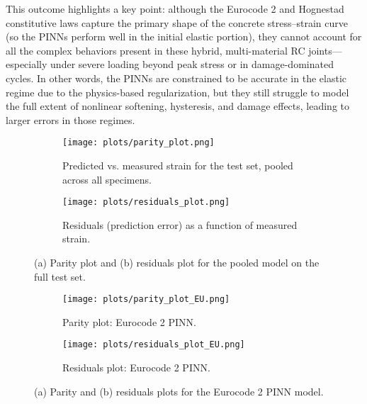 \documentclass{article}
\begin{document}
This outcome highlights a key point: although the Eurocode 2 and Hognestad constitutive laws capture the primary shape of the concrete stress–strain curve (so the PINNs perform well in the initial elastic portion), they cannot account for all the complex behaviors present in these hybrid, multi-material RC joints—especially under severe loading beyond peak stress or in damage-dominated cycles. In other words, the PINNs are constrained to be accurate in the elastic regime due to the physics-based regularization, but they still struggle to model the full extent of nonlinear softening, hysteresis, and damage effects, leading to larger errors in those regimes.


\begin{figure}[H]
    \centering
    \begin{subfigure}[b]{0.48\textwidth}
        \texttt{[image: plots/parity\_plot.png]}
        \caption{Predicted vs. measured strain for the test set, pooled across all specimens.}
        \label{fig:parity_pooled}
    \end{subfigure}
    \hfill
    \begin{subfigure}[b]{0.48\textwidth}
        \texttt{[image: plots/residuals\_plot.png]}
        \caption{Residuals (prediction error) as a function of measured strain.}
        \label{fig:residuals_pooled}
    \end{subfigure}
    \caption{(a) Parity plot and (b) residuals plot for the pooled model on the full test set.}
    \label{fig:pooled_parity_residual}
\end{figure}

\begin{figure}[H]
    \centering
    \begin{subfigure}[b]{0.48\textwidth}
        \texttt{[image: plots/parity\_plot\_EU.png]}
        \caption{Parity plot: Eurocode 2 PINN.}
        \label{fig:parity_EU}
    \end{subfigure}
    \hfill
    \begin{subfigure}[b]{0.48\textwidth}
        \texttt{[image: plots/residuals\_plot\_EU.png]}
        \caption{Residuals plot: Eurocode 2 PINN.}
        \label{fig:residuals_EU}
    \end{subfigure}
    \caption{(a) Parity and (b) residuals plots for the Eurocode 2 PINN model.}
    \label{fig:eu_parity_residual}
\end{figure}
\end{document}

